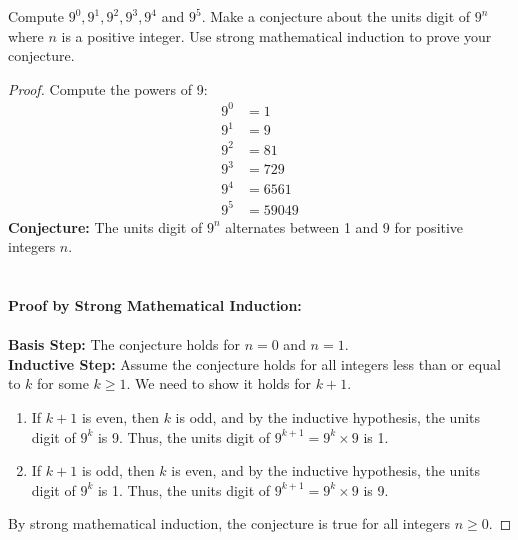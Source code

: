 \documentclass[name=Ojas\ Chaturvedi, emailid=oj.chaturvedi.2024, course=Capstone:\ Discrete\ Math, num=9, deadline={November\ 17,\ 2023}]{homework}
\begin{document}
    Compute $9^0, 9^1, 9^2, 9^3, 9^4$ and $9^5$. Make a conjecture about the units digit of $9^n$ where $n$ is a positive integer. Use strong mathematical induction to prove your conjecture.
\begin{proof}
    Compute the powers of 9:
    \begin{align*}
        9^0 &= 1 \\
        9^1 &= 9 \\
        9^2 &= 81 \\
        9^3 &= 729 \\
        9^4 &= 6561 \\
        9^5 &= 59049
    \end{align*}
    \textbf{Conjecture:}
    The units digit of $9^n$ alternates between 1 and 9 for positive integers $n$. \\ \\ \\
    \textbf{Proof by Strong Mathematical Induction:} \\ \\
    \textbf{Basis Step:}
        The conjecture holds for $n = 0$ and $n = 1$. \\
    \textbf{Inductive Step:}
        Assume the conjecture holds for all integers less than or equal to $k$ for some $k \geq 1$. We need to show it holds for $k+1$.
        \begin{enumerate}
            \item If $k+1$ is even, then $k$ is odd, and by the inductive hypothesis, the units digit of $9^k$ is 9. Thus, the units digit of $9^{k+1} = 9^k \times 9$ is 1.
            \item If $k+1$ is odd, then $k$ is even, and by the inductive hypothesis, the units digit of $9^k$ is 1. Thus, the units digit of $9^{k+1} = 9^k \times 9$ is 9.
        \end{enumerate}
    By strong mathematical induction, the conjecture is true for all integers $n \geq 0$.
\end{proof}
\end{document}
